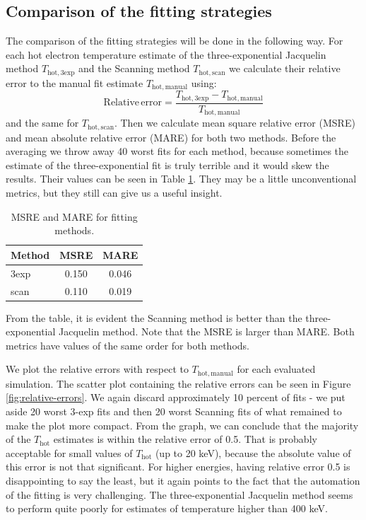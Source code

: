 \subsection*{Comparison of the fitting strategies}
The comparison of the fitting strategies will be done in the following way. For each hot electron temperature estimate of the three-exponential Jacquelin method $T_\mathrm{hot,3exp}$ and the Scanning method $T_\mathrm{hot,scan}$ we calculate their relative error to the manual fit estimate $T_\mathrm{hot,manual}$ using:
\begin{equation}
	\mathrm{Relative \, error} = \frac{T_\mathrm{hot,3exp}-T_\mathrm{hot,manual}}{T_\mathrm{hot,manual}}
\end{equation}
and the same for $T_\mathrm{hot,scan}$. Then we calculate mean square relative error (MSRE) and mean absolute relative error (MARE) for both two methods. Before the averaging we throw away 40 worst fits for each method, because sometimes the estimate of the three-exponential fit is truly terrible and it would skew the results. Their values can be seen in Table \ref{tab:means_mses}. They may be a little unconventional metrics, but they still can give us a useful insight. 

\begin{table}[ht]
	\centering
	\caption{MSRE and MARE for fitting methods.}
	\begin{tabular}{lcc}
		\toprule
		Method & MSRE & MARE \\
		\midrule
		3exp  & 0.150 & 0.046 \\
		scan  & 0.110  & 0.019 \\
		\bottomrule
	\end{tabular}
	
	\label{tab:means_mses}
\end{table}

From the table, it is evident the Scanning method is better than the three-exponential Jacquelin method. Note that the MSRE is larger than MARE. Both metrics have values of the same order for both methods.

We plot the relative errors with respect to $T_\mathrm{hot,manual}$ for each evaluated simulation. The scatter plot containing the relative errors can be seen in Figure \ref{fig:relative-errors}. We again discard approximately 10 percent of fits - we put aside 20 worst 3-exp fits and then 20 worst Scanning fits of what remained to make the plot more compact. From the graph, we can conclude that the majority of the $T_\mathrm{hot}$ estimates is within the relative error of 0.5. That is probably acceptable for small values of $T_\mathrm{hot}$ (up to 20 keV), because the absolute value of this error is not that significant. For higher energies, having relative error 0.5 is disappointing to say the least, but it again points to the fact that the automation of the fitting is very challenging. The three-exponential Jacquelin method seems to perform quite poorly for estimates of temperature higher than 400 keV.

